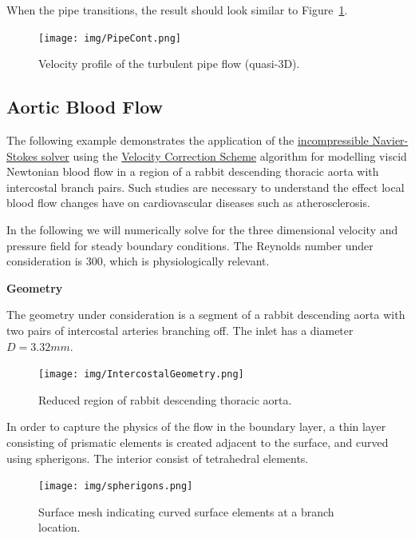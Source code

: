When the pipe transitions, the result should look similar to
Figure~\ref{f:incns:turbpipeflow}.

\begin{figure}
\begin{center}
\texttt{[image: img/PipeCont.png]}
\caption{Velocity profile of the turbulent pipe flow (quasi-3D).}
\label{f:incns:turbpipeflow}
\end{center}
\end{figure}



\subsection{Aortic Blood Flow}
The following example demonstrates the application of the
\hyperref[IncNSsolver]{incompressible Navier-Stokes solver} using the
\hyperref[VCSScheme]{Velocity Correction Scheme} algorithm for modelling viscid
Newtonian blood flow in a region of a rabbit descending thoracic aorta with
intercostal branch pairs. Such studies are necessary to understand the effect
local blood flow changes have on cardiovascular diseases such as
atherosclerosis.

In the following we will numerically solve for the three dimensional velocity
and pressure field for steady boundary conditions. The Reynolds number under
consideration is 300, which is physiologically relevant.

\textbf{Geometry}

The geometry under consideration is a segment of a rabbit descending aorta with two pairs of intercostal arteries branching off. The inlet has a diameter $D=3.32mm$.

\begin{figure}
\begin{center}
\texttt{[image: img/IntercostalGeometry.png]}
\caption{Reduced region of rabbit descending thoracic aorta.}
\end{center}
\end{figure}

In order to capture the physics of the flow in the boundary layer, a thin layer consisting of prismatic elements is created adjacent to the surface, and curved using spherigons. The interior consist of tetrahedral elements.

\begin{figure}
\begin{center}
\texttt{[image: img/spherigons.png]}
\caption{Surface mesh indicating curved surface elements at a branch location.}
\end{center}
\end{figure}


